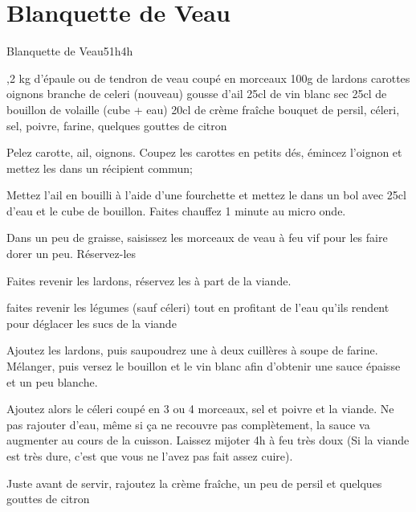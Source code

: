 {\section{Blanquette de Veau}
\begin{recette}{Blanquette de Veau}{5}{1h}{4h}
\begin{ingredients}
,2 kg d'épaule ou de tendron de veau coupé en morceaux
\ingredient 100g de lardons
 carottes
 oignons
 branche de celeri (nouveau)
 gousse d'ail
\ingredient 25cl de vin blanc sec
\ingredient 25cl de bouillon de volaille (cube + eau)
\ingredient 20cl de crème fraîche
 bouquet de persil, céleri, sel, poivre, farine, quelques gouttes de citron
\end{ingredients}

\begin{preparation}
\etape Pelez carotte, ail, oignons. Coupez les carottes en petits dés, émincez l'oignon et mettez les dans un récipient commun;

\etape Mettez l'ail en bouilli à l'aide d'une fourchette et mettez le dans un bol avec 25cl d'eau et le cube de bouillon. 
Faites chauffez 1 minute au micro onde.

\etape Dans un peu de graisse, saisissez les morceaux de veau à feu vif pour les faire dorer un peu. Réservez-les

\etape Faites revenir les lardons, réservez les à part de la viande. 

\etape faites revenir les légumes (sauf céleri) tout en profitant de l'eau qu'ils rendent pour déglacer les sucs de la viande

\etape Ajoutez les lardons, puis saupoudrez une à deux cuillères à soupe de farine. Mélanger, puis versez le bouillon et le vin 
blanc afin d'obtenir une sauce épaisse et un peu blanche. 

\etape Ajoutez alors le céleri coupé en 3 ou 4 morceaux, sel et poivre et la viande. Ne pas rajouter d'eau, même si ça ne recouvre pas complètement, la sauce va augmenter au cours de la cuisson. Laissez mijoter 4h à feu très doux (Si la viande est 
très dure, c'est 
que vous ne l'avez pas fait assez cuire). 

\etape Juste avant de servir, rajoutez la crème fraîche, un peu de persil et quelques gouttes de citron
\end{preparation}
\end{recette}

}
